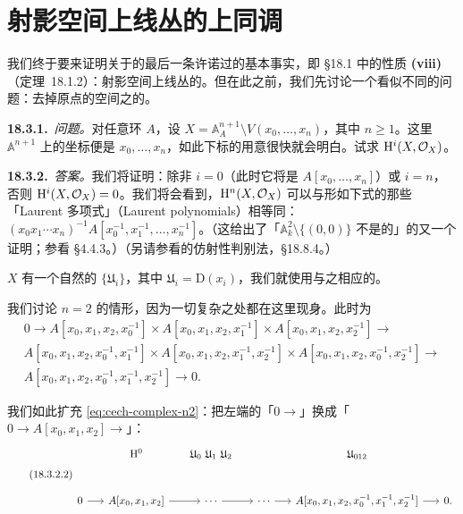 
\section{射影空间上线丛的上同调}

我们终于要来证明关于\trCohomology{}的最后一条许诺过的基本事实，即 \S18.1 中的性质 \textbf{(viii)}（\mbox{定理~18.1.2}）：射影空间上线丛的\trCohomology。但在此之前，我们先讨论一个看似不同的问题：去掉原点的\trAffine{}空间之\trStructureSheaf{}的\trCohomology。

\textbf{18.3.1.}\ \emph{问题。}\quad 对任意环 $A$，设 $X=\mathbb{A}^{n+1}_A\setminus V(x_0,\dots,x_n)$，其中 $n\ge 1$。这里 $\mathbb{A}^{n+1}$ 上的坐标便是 $x_0,\dots,x_n$，如此下标的用意很快就会明白。试求 $\mathrm{H}^i(X,\mathcal{O}_X)$。

\textbf{18.3.2.}\ \emph{答案。}\quad 我们将证明：除非 $i=0$（此时它将是 $A[x_0,\dots,x_n]$）或 $i=n$，否则 $\mathrm{H}^i(X,\mathcal{O}_X)=0$。我们将会看到，$\mathrm{H}^n(X,\mathcal{O}_X)$ 可以与形如下式的那些「Laurent 多项式」（Laurent polynomials）相等同：$(x_0x_1\cdots x_n)^{-1}A[x_0^{-1},x_1^{-1},\dots,x_n^{-1}]$。（这给出了「$\mathbb{A}^2_k\setminus\{(0,0)\}$ 不是\trAffine{}的」的又一个证明；参看 \S4.4.3。）（另请参看\trSerre{}的仿射性\trCohomology{}判别法，\S18.8.4。）

$X$ 有一个自然的\trOpenCover{} $\{\mathfrak{U}_i\}$，其中 $\mathfrak{U}_i=\mathrm{D}(x_i)$，我们就使用与之相应的\trCech\trComplexN。

我们讨论 $n=2$ 的情形，因为一切复杂之处都在这里现身。此时\trCech\trComplexN{}为
\begin{equation*}\tag{18.3.2.1}\label{eq:cech-complex-n2}
\begin{aligned}
0\longrightarrow A[x_0,x_1,x_2,x_0^{-1}]\times A[x_0,x_1,x_2,x_1^{-1}]\times A[x_0,x_1,x_2,x_2^{-1}]\longrightarrow{}\\
A[x_0,x_1,x_2,x_0^{-1},x_1^{-1}]\times A[x_0,x_1,x_2,x_1^{-1},x_2^{-1}]\times A[x_0,x_1,x_2,x_0^{-1},x_2^{-1}]\longrightarrow{}\\
A[x_0,x_1,x_2,x_0^{-1},x_1^{-1},x_2^{-1}]\longrightarrow 0.
\end{aligned}
\end{equation*}

我们如此扩充 \eqref{eq:cech-complex-n2}：把左端的「$0\to$」换成「$0\to A[x_0,x_1,x_2]\to$」：
\begin{equation*}\tag{18.3.2.2}\label{eq:extended-complex-n2}
\begin{tikzcd}[row sep=2.6em, column sep=1.55em]
& \mathrm{H}^0 & \mathfrak{U}_0\ \mathfrak{U}_1\ \mathfrak{U}_2 & & \mathfrak{U}_{012} & \\
0 \ar[r] & A[x_0,x_1,x_2] \ar[r] & \cdots \ar[r] & \cdots \ar[r] & A[x_0,x_1,x_2,x_0^{-1},x_1^{-1},x_2^{-1}] \ar[r] & 0.
\end{tikzcd}
\end{equation*}


